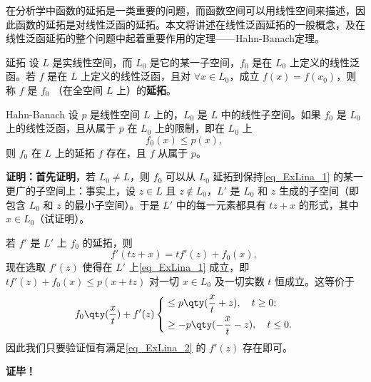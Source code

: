 
在分析学中函数的延拓是一类重要的问题，而函数空间可以用线性空间来描述，因此函数的延拓是对线性泛函的延拓。本文将讲述在线性泛函延拓的一般概念，及在线性泛函延拓的整个问题中起着重要作用的定理——Hahn-Banach定理。

\begin{definition}{延拓}
设 $L$ 是实线性空间，而 $L_0$ 是它的某一子空间，$f_0$ 是在 $L_0$ 上定义的线性泛函。若 $f$ 是在 $L$ 上定义的线性泛函，且对 $\forall x\in L_0$，成立 $f(x)=f(x_0)$，则称 $f$ 是 $f_0$ （在全空间 $L$ 上）的\textbf{延拓}。
\end{definition}


\begin{theorem}{Hahn-Banach}
设 $p$ 是线性空间 $L$ 上的，$L_0$ 是 $L$ 中的线性子空间。如果 $f_0$ 是 $L_0$ 上的线性泛函，且从属于 $p$ 在 $L_0$ 上的限制，即在 $L_0$ 上
\begin{equation}\label{eq_ExLina_1}
f_0(x)\leq p(x),~
\end{equation}
则 $f_0$ 在 $L$ 上的延拓 $f$ 存在，且 $f$ 从属于 $p$。
\end{theorem}

\textbf{证明：}\textbf{首先证明}，若 $L_0\neq L$，则 $f_0$ 可以从 $L_0$ 延拓到保持\autoref{eq_ExLina_1} 的某一更广的子空间上：事实上，设 $z\in L$ 且 $z\notin L_0$，$L'$ 是 $L_0$ 和 $z$ 生成的子空间（即包含 $L_0$ 和 $z$ 的最小子空间）。于是 $L'$ 中的每一元素都具有 $tz+x$ 的形式，其中 $x\in L_0$（试证明）。

若 $f'$ 是 $L'$ 上 $f_0$ 的延拓，则
\begin{equation}
f'(tz+x)=tf'(z)+f_0(x),~
\end{equation}
现在选取 $f'(z)$ 使得在 $L'$ 上\autoref{eq_ExLina_1} 成立，即 $tf'(z)+f_0(x)\leq p(x+tz)$ 对一切 $x\in L_0$ 及一切实数 $t$ 恒成立。这等价于
\begin{equation}\label{eq_ExLina_2}
f_0\qty(\frac{x}{t})+f'(z)\left\{\begin{aligned}
&\leq p\qty(\frac{x}{t}+z),\quad t\geq 0;\\
&\geq -p\qty(-\frac{x}{t}-z),\quad t\leq 0.
\end{aligned}\right.
~
\end{equation}
因此我们只要验证恒有满足\autoref{eq_ExLina_2} 的 $f'(z)$ 存在即可。



\textbf{证毕！}



